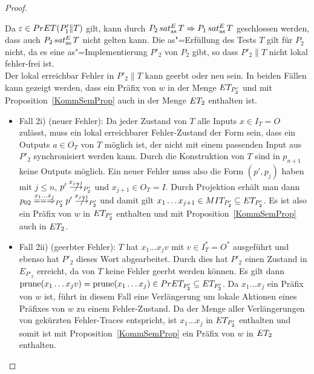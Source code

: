 \begin{proof}
\begin{itemize}
\begin{itemize}
      \end{itemize}
      Da $\varepsilon\in PrET (P'_1\|T)$ gilt, kann durch $P_2\hspace{0.05cm}sat_\mathrm{as}^E\hspace{0.05cm} T
      \Rightarrow P_1\hspace{0.05cm}sat_\mathrm{as}^E\hspace{0.05cm} T$ geschlossen werden, dass auch $P_2\hspace{0.05cm}sat_\mathrm{as}^E\hspace{0.05cm} T$
      nicht gelten kann. Die as"=Erfüllung des Tests $T$ gilt für $P_2$ nicht,
      da es eine as"=Implementierung $P'_2$ von $P_2$ gibt, so dass $P'_2\|T$
      nicht lokal fehler-frei ist.\\
      Der lokal erreichbar Fehler in $P'_2\|T$ kann geerbt oder neu sein. In
      beiden Fällen kann gezeigt werden, dass ein Präfix von $w$ in der Menge
      $ET _{P'_2}$ und mit Proposition~\ref{KommSemProp} auch in der Menge
      $ET _2$ enthalten ist.
      \begin{itemize}
        \item Fall 2i) (neuer Fehler): Da jeder Zustand von $T$ alle Inputs
          $x\in I_T=O$ zulässt, muss ein lokal erreichbarer Fehler-Zustand der
          Form sein, dass ein Outputs $a\in O_T$ von $T$ möglich ist, der nicht
          mit einem passenden Input aus $P'_2$ synchronisiert werden kann.
          Durch die Konstruktion von $T$ sind in $p_{n+1}$ keine Outputs
          möglich. Ein neuer Fehler muss also die Form $(p',p_j)$ haben mit
          $j\leq n$, $p'\nmust[x_{j+1}]_{P'_2}$ und $x_{j+1}\in O_T=I$. Durch
          Projektion erhält man dann $p_{02} \lweakmay[x_1\dots x_j]_{P'_2} p'
          \nmust[x_{j+1}]_{P'_2}$ und damit gilt $x_1\dots x_{j+1}\in MIT
          _{P'_2} \subseteq ET _{P'_2}$. Es ist also ein Präfix von $w$ in
          $ET _{P'_2}$ enthalten und mit Proposition~\ref{KommSemProp} auch in
          $ET _2$.
        \item Fall 2ii) (geerbter Fehler): $T$ hat $x_1\dots x_j v$ mit $v\in
          I^*_T =O^*$ ausgeführt und ebenso hat $P'_2$ dieses Wort
          abgearbeitet. Durch dies hat $P'_2$ einen Zustand in $E _{P'_2}$
          erreicht, da von $T$ keine Fehler geerbt werden können. Es gilt dann
          $\mathrm{prune} (x_1\dots x_j v) = \mathrm{prune} (x_1\dots x_j)\in PrET _{P'_2}
          \subseteq ET _{P'_2}$. Da $x_1\dots x_j$ ein Präfix von $w$ ist,
          führt in diesem Fall eine Verlängerung um lokale Aktionen eines
          Präfixes von $w$ zu einem Fehler-Zustand. Da \ET{} der Menge aller
          Verlängerungen von gekürzten Fehler-Traces entspricht, ist $x_1\dots
          x_j$ in $ET _{P'_2}$ enthalten und somit ist mit
          Proposition~\ref{KommSemProp} ein Präfix von $w$ in $ET _2$
          enthalten.
      \end{itemize}

\end{itemize}
\end{proof}
